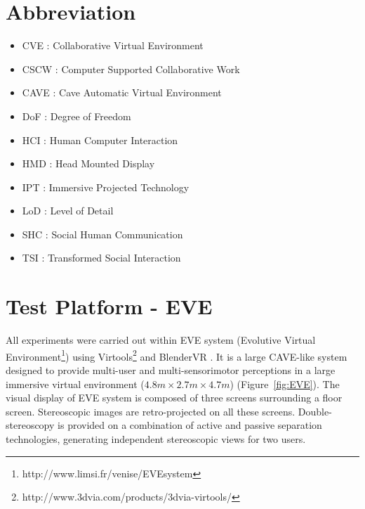 \begin{appendices}
\appendixpage
\noappendicestocpagenum
\addappheadtotoc

\chapter{Abbreviation}
\label{appendix:abbreviation}
\begin{multicols}{2}
\begin{itemize}
	\item CVE : Collaborative Virtual Environment
	\item CSCW : Computer Supported Collaborative Work
	\item CAVE : Cave Automatic Virtual Environment
	\item DoF : Degree of Freedom
	\item HCI : Human Computer Interaction
	\item HMD : Head Mounted Display
	\item IPT : Immersive Projected Technology
	\item LoD : Level of Detail
	\item SHC : Social Human Communication
	\item TSI : Transformed Social Interaction
\end{itemize}
\end{multicols}

\chapter{Test Platform - EVE}
\label{appendix:platform}
All experiments were carried out within EVE system (Evolutive Virtual Environment\footnote{http://www.limsi.fr/venise/EVEsystem}) using Virtools\footnote{http://www.3dvia.com/products/3dvia-virtools/} and BlenderVR \citep{BlenderVR2015}. It is a large CAVE-like system designed to provide multi-user and multi-sensorimotor perceptions in a large immersive virtual environment ($4.8m\times2.7m\times4.7m$) (Figure~\ref{fig:EVE}). The visual display of EVE system is composed of three screens surrounding a floor screen. Stereoscopic images are retro-projected on all these screens. Double-stereoscopy is provided on a combination of active and passive separation technologies, generating independent stereoscopic views for two users.


\end{appendices}

